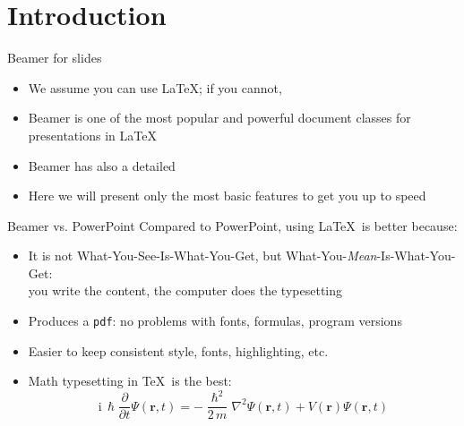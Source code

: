 \section{Introduction}

\begin{frame}{Beamer for slides}
\begin{itemize}
    \item We assume you can use \LaTeX; if you cannot,
    \item Beamer is one of the most popular and powerful document classes for presentations in \LaTeX
    \item Beamer has also a detailed
    \item Here we will present only the most basic features to get you up to speed
\end{itemize}
\end{frame}


\begin{frame}{Beamer vs. PowerPoint}
Compared to PowerPoint, using \LaTeX\ is better because:
\begin{itemize}
    \item It is not What-You-See-Is-What-You-Get, but What-You-\emph{Mean}-Is-What-You-Get:\\ you write the content, the computer does the typesetting
    \item Produces a \texttt{pdf}: no problems with fonts, formulas, program versions
    \item Easier to keep consistent style, fonts, highlighting, etc.
    \item Math typesetting in \TeX\ is the best:
\begin{equation*}
    \mathrm{i}\,\hslash\frac{\partial}{\partial t} \Psi(\mathbf{r},t) = -\frac{\hslash^2}{2\,m}\nabla^2\Psi(\mathbf{r},t) + V(\mathbf{r})\Psi(\mathbf{r},t)
\end{equation*}
\end{itemize}
\end{frame}

